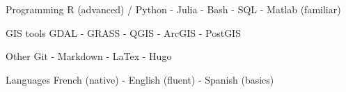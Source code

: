 \vspace{-20pt}


\begin{cvskills}

  \cvskill
    {Programming} %
    {R (advanced) / Python - Julia - Bash - SQL - Matlab (familiar)} %

  \cvskill
    {GIS tools} %
    {GDAL - GRASS - QGIS - ArcGIS - PostGIS} %

  \cvskill
    {Other} %
    {Git - Markdown - LaTex - Hugo} %

  \cvskill
    {Languages} %
    {French (native) - English (fluent) - Spanish (basics)} %

\end{cvskills}
